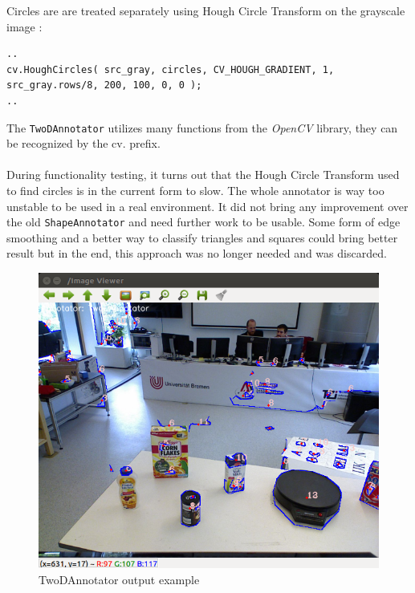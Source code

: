 \documentclass[main.tex]{subfiles}
\begin{document}
Circles are are treated separately using Hough Circle Transform on the grayscale image : 

\begin{lstlisting}
..
cv.HoughCircles( src_gray, circles, CV_HOUGH_GRADIENT, 1, src_gray.rows/8, 200, 100, 0, 0 );
..
\end{lstlisting}

The \texttt{TwoDAnnotator} utilizes many functions from the \textit{OpenCV} library, they can be recognized by the cv. prefix. \\ \\
During functionality testing, it turns out that the Hough Circle Transform used to find circles is in the current form to slow. The whole annotator is way too unstable to be used in a real environment. It did not bring any improvement over the old \texttt{ShapeAnnotator} and need further work to be usable. Some form of edge smoothing and a better way to classify triangles and squares could bring better result but in the end, this approach was no longer needed and was discarded.
\begin{figure}[H]
\centering
\includegraphics[width=1\textwidth]{pictures/perception/TwoDAnnotator.png}
\caption{TwoDAnnotator output example}
\end{figure}
\end{document}
